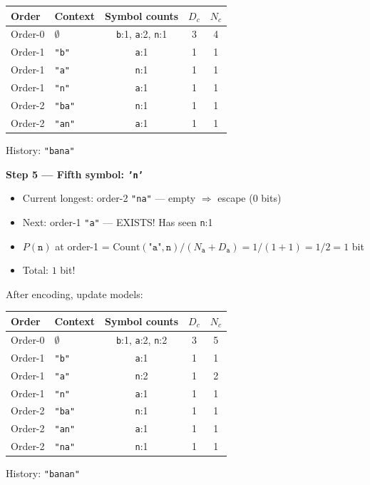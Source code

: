 \begin{examplebox}
\begin{center}
\footnotesize
\begin{tabular}{|l|l|c|c|c|}
\hline
\textbf{Order} & \textbf{Context} & \textbf{Symbol counts} & $D_c$ & $N_c$ \\
\hline
Order-0 & $\emptyset$ & \texttt{b}:1, \texttt{a}:2, \texttt{n}:1 & 3 & 4 \\
Order-1 & \texttt{"b"} & \texttt{a}:1 & 1 & 1 \\
Order-1 & \texttt{"a"} & \texttt{n}:1 & 1 & 1 \\
Order-1 & \texttt{"n"} & \texttt{a}:1 & 1 & 1 \\
Order-2 & \texttt{"ba"} & \texttt{n}:1 & 1 & 1 \\
Order-2 & \texttt{"an"} & \texttt{a}:1 & 1 & 1 \\
\hline
\end{tabular}
\end{center}
History: \texttt{"bana"}

\bigskip
\textbf{Step 5 — Fifth symbol: \texttt{'n'}}
\begin{itemize}
    \item Current longest: order-2 \texttt{"na"} — empty $\Rightarrow$ escape (0 bits)
    \item Next: order-1 \texttt{"a"} — EXISTS! Has seen \texttt{n}:1
    \item $P(\texttt{n})$ at order-1 = $\text{Count}(\texttt{"a"},\texttt{n})/(N_{\texttt{a}}+D_{\texttt{a}}) = 1/(1+1) = 1/2 = 1$ bit
    \item Total: $1$ bit!
\end{itemize}
After encoding, update models:

\begin{center}
\footnotesize
\begin{tabular}{|l|l|c|c|c|}
\hline
\textbf{Order} & \textbf{Context} & \textbf{Symbol counts} & $D_c$ & $N_c$ \\
\hline
Order-0 & $\emptyset$ & \texttt{b}:1, \texttt{a}:2, \texttt{n}:2 & 3 & 5 \\
Order-1 & \texttt{"b"} & \texttt{a}:1 & 1 & 1 \\
Order-1 & \texttt{"a"} & \texttt{n}:2 & 1 & 2 \\
Order-1 & \texttt{"n"} & \texttt{a}:1 & 1 & 1 \\
Order-2 & \texttt{"ba"} & \texttt{n}:1 & 1 & 1 \\
Order-2 & \texttt{"an"} & \texttt{a}:1 & 1 & 1 \\
Order-2 & \texttt{"na"} & \texttt{n}:1 & 1 & 1 \\
\hline
\end{tabular}
\end{center}
History: \texttt{"banan"}


\end{examplebox}
